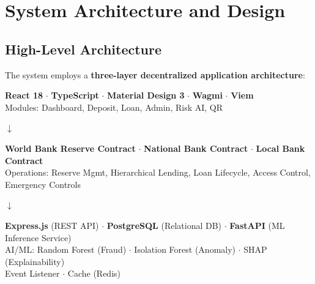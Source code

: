 \documentclass[12pt,a4paper]{report}
\begin{document}
\chapter{System Architecture and Design}

\section{High-Level Architecture}

The system employs a \textbf{three-layer decentralized application architecture}:

\vspace{6pt}
\begin{minipage}{\textwidth}
\begin{center}
\begin{tcolorbox}[colback=white,colframe=black,coltitle=white,fonttitle=\bfseries\small,title={PRESENTATION LAYER},boxrule=0.8pt,arc=3pt,left=6pt,right=6pt,top=4pt,bottom=4pt]
\textbf{React 18} \(\cdot\) \textbf{TypeScript} \(\cdot\) \textbf{Material Design 3} \(\cdot\) \textbf{Wagmi} \(\cdot\) \textbf{Viem}\\[4pt]
{\small Modules: Dashboard, Deposit, Loan, Admin, Risk AI, QR}
\end{tcolorbox}

\vspace{2pt}
{\Large $\boldsymbol{\downarrow}$}
\vspace{2pt}

\begin{tcolorbox}[colback=white,colframe=black,coltitle=white,fonttitle=\bfseries\small,title={SMART CONTRACT LAYER \normalfont\small(EVM: Ethereum / Polygon)},boxrule=0.8pt,arc=3pt,left=6pt,right=6pt,top=4pt,bottom=4pt]
\textbf{World Bank Reserve Contract} \(\cdot\) \textbf{National Bank Contract} \(\cdot\) \textbf{Local Bank Contract}\\[4pt]
{\small Operations: Reserve Mgmt, Hierarchical Lending, Loan Lifecycle, Access Control, Emergency Controls}
\end{tcolorbox}

\vspace{2pt}
{\Large $\boldsymbol{\downarrow}$}
\vspace{2pt}

\begin{tcolorbox}[colback=white,colframe=black,coltitle=white,fonttitle=\bfseries\small,title={OFF-CHAIN SERVICES LAYER},boxrule=0.8pt,arc=3pt,left=6pt,right=6pt,top=4pt,bottom=4pt]
\textbf{Express.js} (REST API) \(\cdot\) \textbf{PostgreSQL} (Relational DB) \(\cdot\) \textbf{FastAPI} (ML Inference Service)\\[4pt]
{\small AI/ML: Random Forest (Fraud) \(\cdot\) Isolation Forest (Anomaly) \(\cdot\) SHAP (Explainability)}\\[2pt]
{\small Event Listener \(\cdot\) Cache (Redis)}
\end{tcolorbox}
\end{center}
\end{minipage}
\vspace{6pt}
\end{document}
